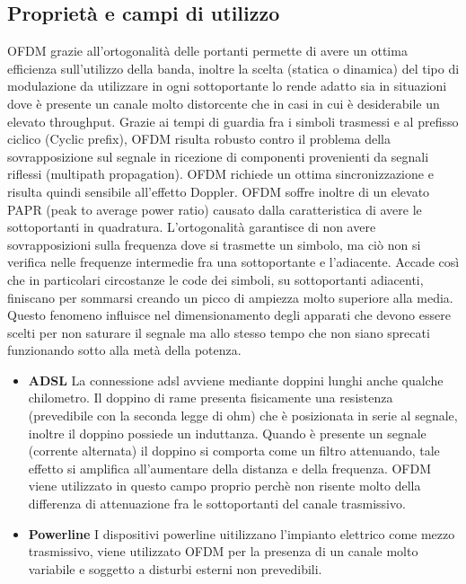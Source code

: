\begin{itemize}
\section{Proprietà e campi di utilizzo}
OFDM grazie all'ortogonalità delle portanti permette di avere un ottima efficienza sull'utilizzo della banda, inoltre la scelta (statica o dinamica) del tipo di modulazione da utilizzare in ogni sottoportante lo rende adatto sia in situazioni dove è presente un canale molto distorcente che in casi in cui è desiderabile un elevato throughput. Grazie ai tempi di guardia fra i simboli trasmessi e al prefisso ciclico (Cyclic prefix), OFDM risulta robusto contro il problema della sovrapposizione sul segnale in ricezione di componenti provenienti da segnali riflessi (multipath propagation). OFDM richiede un ottima sincronizzazione e risulta quindi sensibile all'effetto Doppler. OFDM soffre inoltre di un elevato PAPR (peak to average power ratio) causato dalla caratteristica di avere le sottoportanti in quadratura. L'ortogonalità garantisce di non avere sovrapposizioni sulla frequenza dove si trasmette un simbolo, ma ciò non si verifica nelle frequenze intermedie fra una sottoportante e l'adiacente. Accade così che in particolari circostanze le code dei simboli, su sottoportanti adiacenti, finiscano per sommarsi creando un picco di ampiezza molto superiore alla media. Questo fenomeno influisce nel dimensionamento degli apparati che devono essere scelti per non saturare il segnale ma allo stesso tempo che non siano sprecati funzionando sotto alla metà della potenza.
\cite{papr}
\begin{itemize}
	\item \textbf{ADSL} La connessione adsl avviene mediante doppini lunghi anche qualche chilometro. Il doppino di rame presenta fisicamente una resistenza (prevedibile con la seconda legge di ohm) che è posizionata in serie al segnale, inoltre il doppino possiede un induttanza. Quando è presente un segnale (corrente alternata) il doppino si comporta come un filtro attenuando, tale effetto si amplifica all'aumentare della distanza e della frequenza. OFDM viene utilizzato in questo campo proprio perchè non risente molto della differenza di attenuazione fra le sottoportanti del canale trasmissivo.
\end{itemize}
\begin{itemize}
	\item \textbf{Powerline} I dispositivi powerline uitilizzano l'impianto elettrico come mezzo trasmissivo, viene utilizzato OFDM per la presenza di un canale molto variabile e soggetto a disturbi esterni non prevedibili.

\end{itemize}
\end{itemize}
